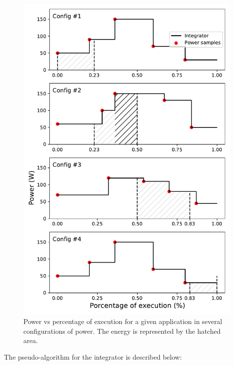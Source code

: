 \begin{figure}[H]
	\centering
	\includegraphics[width=\columnwidth]{phases/figures/integrator.pdf}
	\caption{Power vs percentage of execution for a given application in several configurations of power. The energy is represented by the hatched area.}
	\label{fig:zero_order}
\end{figure}

The pseudo-algorithm for the integrator is described below:

